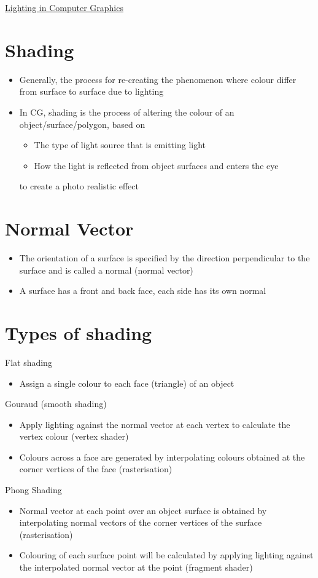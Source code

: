 \documentclass{article}[18pt]
\begin{document}
\begin{center}
\underline{\huge Lighting in Computer Graphics}
\end{center}
\section{Shading}
\begin{itemize}
	\item Generally, the process for re-creating the phenomenon where colour differ from surface to surface due to lighting
	\item In CG, shading is the process of altering the colour of an object/surface/polygon, based on
	\begin{itemize}
		\item The type of light source that is emitting light
		\item How the light is reflected from object surfaces and enters the eye
	\end{itemize}
to create a photo realistic effect
\end{itemize}
\section{Normal Vector}
\begin{itemize}
	\item The orientation of a surface is specified by the direction perpendicular to the surface and is called a normal (normal vector)
	\item A surface has a front and back face, each side has its own normal
\end{itemize}
\section{Types of shading}
Flat shading
\begin{itemize}
	\item Assign a single colour to each face (triangle) of an object
\end{itemize}
Gouraud (smooth shading)
\begin{itemize}
	\item Apply lighting against the normal vector at each vertex to calculate the vertex colour (vertex shader)
	\item Colours across a face are generated by interpolating colours obtained at the corner vertices of the face (rasterisation)
\end{itemize}
Phong Shading
\begin{itemize}
	\item Normal vector at each point over an object surface is obtained by interpolating normal vectors of the corner vertices of the surface (rasterisation)
	\item Colouring of each surface point will be calculated by applying lighting against the interpolated normal vector at the point (fragment shader)
\end{itemize}
\end{document}
